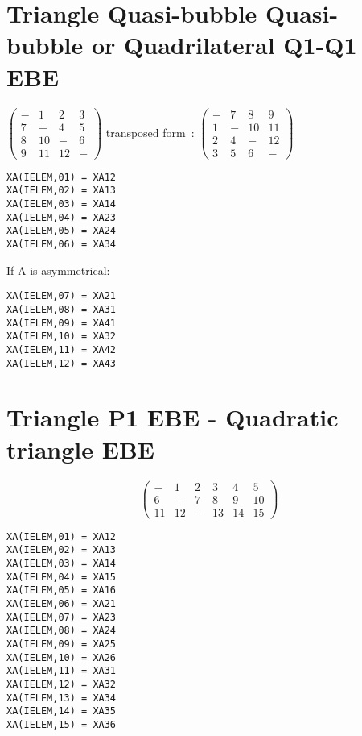 \section{Triangle Quasi-bubble Quasi-bubble or Quadrilateral Q1-Q1 EBE}

$\left(\begin{array}{cccc}
    {-} & {1} & {2} & {3} \\
    {7} & {-} & {4} & {5} \\
    {8} & {10} & {-} & {6} \\
    {9} & {11} & {12} & {-}
\end{array}\right)$
transposed form~:
$\left(\begin{array}{cccc}
    {-} & {7} & {8} & {9} \\
    {1} & {-} & {10} & {11} \\
    {2} & {4} & {-} & {12} \\
    {3} & {5} & {6} & {-}
\end{array}\right)$

\begin{lstlisting}[language=TelFortran]
XA(IELEM,01) = XA12
XA(IELEM,02) = XA13
XA(IELEM,03) = XA14
XA(IELEM,04) = XA23
XA(IELEM,05) = XA24
XA(IELEM,06) = XA34
\end{lstlisting}

If A is asymmetrical:

\begin{lstlisting}[language=TelFortran]
XA(IELEM,07) = XA21
XA(IELEM,08) = XA31
XA(IELEM,09) = XA41
XA(IELEM,10) = XA32
XA(IELEM,11) = XA42
XA(IELEM,12) = XA43
\end{lstlisting}


\section{Triangle P1 EBE - Quadratic triangle EBE}

\[\left(\begin{array}{cccccc}
      {-} & {1} & {2} & {3} & {4} & {5} \\
      {6} & {-} & {7} & {8} & {9} & {10} \\
      {11} & {12} & {-} & {13} & {14} & {15}
\end{array}\right) \]

\begin{lstlisting}[language=TelFortran]
XA(IELEM,01) = XA12
XA(IELEM,02) = XA13
XA(IELEM,03) = XA14
XA(IELEM,04) = XA15
XA(IELEM,05) = XA16
XA(IELEM,06) = XA21
XA(IELEM,07) = XA23
XA(IELEM,08) = XA24
XA(IELEM,09) = XA25
XA(IELEM,10) = XA26
XA(IELEM,11) = XA31
XA(IELEM,12) = XA32
XA(IELEM,13) = XA34
XA(IELEM,14) = XA35
XA(IELEM,15) = XA36
\end{lstlisting}


